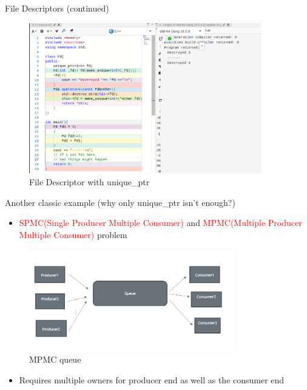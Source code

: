 \documentclass[
  10pt,
  ignorenonframetext,
]{beamer}
\providecommand{\tightlist}{%
  \setlength{\itemsep}{0pt}\setlength{\parskip}{0pt}}
\begin{document}
\begin{frame}{File Descriptors (continued)}
\protect\hypertarget{file-descriptors-continued}{}
\pause

\begin{figure}
\centering
\includegraphics[width=0.9\textwidth,height=\textheight]{images/./fd.png}
\caption{File Descriptor with unique\_ptr}
\end{figure}

\pause

\vspace{-10pt}

\end{frame}

\begin{frame}{Another classic example (why only
unique\_ptr isn't enough?)}
\protect\hypertarget{another-classic-example-why-only-unique_ptr-isnt-enough}{}
\begin{itemize}
\tightlist
\item
  \textcolor{red}{SPMC(Single Producer Multiple Consumer) }
  and
  \textcolor{red}{MPMC(Multiple Producer Multiple Consumer)}
  problem
\end{itemize}

\pause

\begin{figure}
\centering
\includegraphics[width=0.8\textwidth,height=\textheight]{images/mpmc.png}
\caption{MPMC queue}
\end{figure}

\pause

\begin{itemize}
\tightlist
\item
  Requires multiple owners for producer end as
  well as the consumer end
\end{itemize}
\end{frame}
\end{document}
